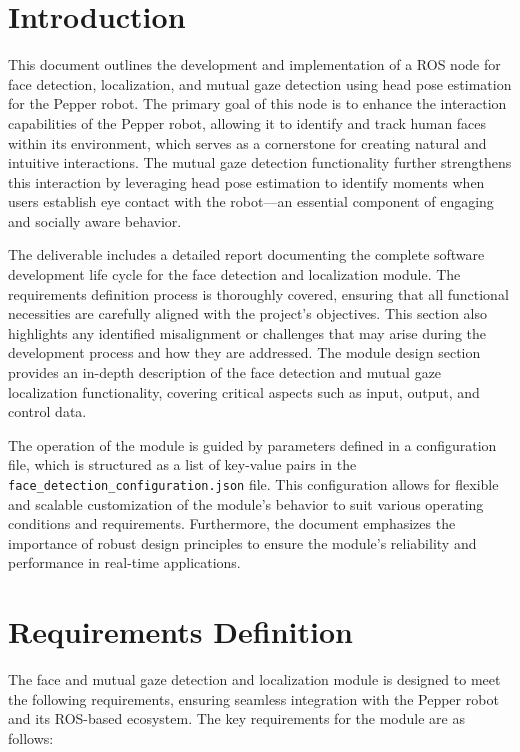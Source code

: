 \documentclass{CSSRforAfrica}
\begin{document}
\newpage
 
 
\pagebreak
\tableofcontents
\newpage


\section{Introduction}
This document outlines the development and implementation of a ROS node for face detection, localization, and mutual gaze detection using head pose estimation for the Pepper robot. The primary goal of this node is to enhance the interaction capabilities of the Pepper robot, allowing it to identify and track human faces within its environment, which serves as a cornerstone for creating natural and intuitive interactions. The mutual gaze detection functionality further strengthens this interaction by leveraging head pose estimation to identify moments when users establish eye contact with the robot—an essential component of engaging and socially aware behavior.

The deliverable includes a detailed report documenting the complete software development life cycle for the face detection and localization module. The requirements definition process is thoroughly covered, ensuring that all functional necessities are carefully aligned with the project's objectives. This section also highlights any identified misalignment or challenges that may arise during the development process and how they are addressed. The module design section provides an in-depth description of the face detection and mutual gaze localization functionality, covering critical aspects such as input, output, and control data.

The operation of the module is guided by parameters defined in a configuration file, which is structured as a list of key-value pairs in the \texttt{face\_detection\_configuration.json} file. This configuration allows for flexible and scalable customization of the module's behavior to suit various operating conditions and requirements. Furthermore, the document emphasizes the importance of robust design principles to ensure the module's reliability and performance in real-time applications.

\newpage

\section{Requirements Definition}
The face and mutual gaze detection and localization module is designed to meet the following requirements, ensuring seamless integration with the Pepper robot and its ROS-based ecosystem. The key requirements for the module are as follows:
\end{document}
